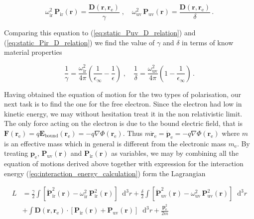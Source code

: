 \documentclass[12pt]{report}
\renewcommand{\vec}[1]{\boldsymbol{\mathbf{#1}}}                        %
\newcommand*\diff{\mathop{}\!\mathrm{d}}
\begin{document}
\begin{equation}
	\label{eq:driven_harmonic_oscillator}
	\omega^2_\text{ir} \, \vec P_\text{ir} (\vec r) = \frac{ \vec D(\vec r, \vec r_\text{e})}{ \gamma }
	\; , \quad
	\omega^2_\text{uv} \, \vec P_\text{uv} (\vec r) = \frac{ \vec D(\vec r, \vec r_\text{e})}{ \delta } \,.
\end{equation}

Comparing this equation to (\ref{eq:static_Puv_D_relation}) and (\ref{eq:static_Pir_D_relation}) we find the value of $ \gamma $ and $ \delta $ in terms of know material properties

\begin{equation}
	\frac{1}{\gamma} = \frac{\omega_\text{ir}^2}{4 \pi} \left( \frac{1}{\epsilon_\infty} - \frac{1}{\epsilon} \right)
	\; , \quad
	\frac{1}{\delta} = \frac{\omega_\text{uv}^2}{4 \pi} \left( 1 - \frac{1}{\epsilon_\infty} \right) \,.
\end{equation}

Having obtained the equation of motion for the two types of polarisation, our next task is to find the one for the free electron. Since the electron had low in kinetic energy, we may without hesitation treat it in the non relativistic limit. The only force acting on the electron is due to the bound electric field, that is $ \vec F(\vec r_\text{e}) = q \vec E_\text{bound} (\vec r_\text{e}) = - q \nabla \Phi (\vec r_\text{e}) $. Thus $ m \ddot{\vec r}_\text{e} = \dot{\vec p}_\text{e} = - q \nabla \Phi (\vec r_\text{e}) $ where $ m $ is an effective mass which in general is different from the electronic mass $ m_\text{e} $. By treating $ \vec p_\text{e} $,  $ \vec P_\text{uv} (\vec r) $ and $ \vec P_\text{ir} (\vec r) $ as variables, we may by combining all the equation of motions derived above together with expression for the interaction energy (\ref{eq:interaction_energy_calculation}) form the Lagrangian

\begin{equation}
	\begin{split}
		L &= \frac{\gamma}{2} \int \left[ \dot{\vec P}_\text{ir}^2 (\vec r) - \omega_\text{ir}^2 \, \vec P_\text{ir}^2 (\vec r) \right] \diff^3 r
		+ \frac{\delta}{2} \int \left[ \dot{\vec P}_\text{uv}^2 (\vec r) - \omega_\text{uv}^2 \, \vec P_\text{uv}^2 (\vec r) \right] \diff^3 r \\
		&+ \int \vec D(\vec r, \vec r_\text{e}) \cdot \left[ \vec P_\text{ir}(\vec r) +  \vec P_\text{uv}(\vec r) \right] \diff^3 r
		+ \frac{\vec p_\text{e}^2}{2m}
	\end{split}
\end{equation}
\end{document}
